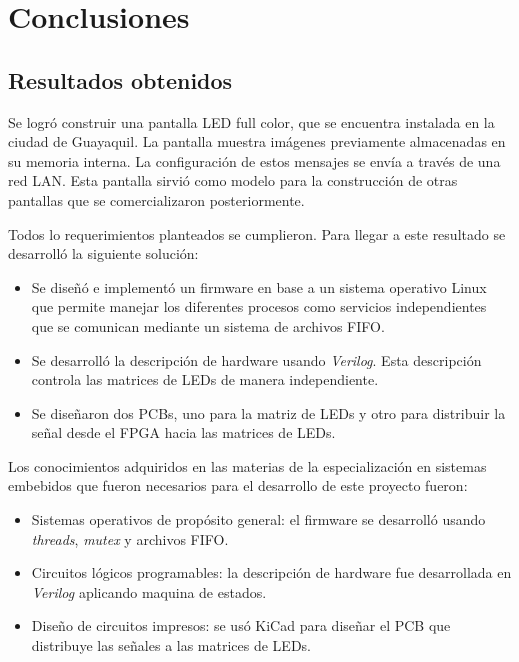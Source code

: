 
\chapter{Conclusiones} %

\label{Chapter5} %



\section{Resultados obtenidos}




Se logró construir una pantalla LED full color, que se encuentra instalada en la ciudad de Guayaquil. La pantalla muestra imágenes previamente almacenadas en su memoria interna. La configuración de estos mensajes se envía a través de una red LAN. Esta pantalla sirvió como modelo para la construcción de otras pantallas que se comercializaron posteriormente.

Todos lo requerimientos planteados se cumplieron. Para llegar a este resultado se desarrolló la siguiente solución:
\begin{itemize}
\item Se diseñó e implementó un firmware en base a un sistema operativo Linux que permite manejar los diferentes procesos como servicios independientes que se comunican mediante un sistema de archivos FIFO.
\item Se desarrolló la descripción de hardware usando \textit{Verilog}.  Esta descripción controla las matrices de LEDs de manera independiente.
\item Se diseñaron dos PCBs, uno para la matriz de LEDs y otro para distribuir la señal desde el FPGA hacia las matrices de LEDs.
\end{itemize}
Los conocimientos adquiridos en las materias de la especialización en sistemas embebidos que fueron necesarios para el desarrollo de este proyecto fueron:
\begin{itemize}
\item Sistemas operativos de propósito general: el firmware se desarrolló usando \textit{threads}, \textit{mutex} y archivos FIFO.
\item Circuitos lógicos programables: la descripción de hardware fue desarrollada en \textit{Verilog} aplicando maquina de estados.
\item Diseño de circuitos impresos: se usó KiCad para diseñar el PCB que distribuye las señales a las matrices de LEDs.
\end{itemize}


